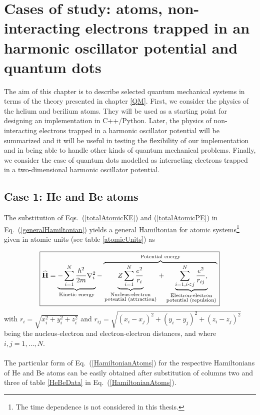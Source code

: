 
\chapter{Cases of study: atoms, non-interacting electrons trapped in an harmonic oscillator potential and quantum dots}\label{cases}

The aim of this chapter is
to describe selected quantum mechanical systems in terms of the theory presented in chapter \ref{QM}. First, we consider the physics of the helium and berilium atoms. They will be used as a starting point for designing an implementation in C++/Python. Later, the physics of non-interacting electrons trapped in a harmonic oscillator potential will be summarized and it will be useful in testing the flexibility of our implementation and in being able to handle other kinds of quantum mechanical problems. Finally, we consider the case of quantum dots modelled as interacting electrons trapped in a two-dimensional  
harmonic oscillator potential. 

\section{Case 1: He and Be atoms}
The substitution of Eqs.~(\ref{totalAtomicKE}) and (\ref{totalAtomicPE}) in Eq.~(\ref{generalHamiltonian}) yields a general  Hamiltonian for atomic systems\footnote{The time dependence is not considered in this thesis.} given in atomic units (see table \ref{atomicUnits}) as 

\begin{equation}\label{HamiltonianAtoms}
\boxed{{\bf\widehat{H}} = \underbrace{-\sum_{i=1}^{N}\frac{\hbar^2}{2m}\nabla^{2}_{i}}_{\text{Kinetic energy}} 
  - \overbrace{\underbrace{Z \sum_{i=1}^{N} \frac{e^2}{r_i}}_{\begin{smallmatrix} \text{Nucleus-electron} \\ \text{potential (attraction)} \end{smallmatrix}}
  + \underbrace{\sum_{i=1,i<j}^{N} \frac{e^2}{r_{ij}},}_{\begin{smallmatrix} \text{Electron-electron} \\ \text{potential (repulsion)} \end{smallmatrix}}}^{\text{Potential energy}}}
\end{equation}
with $r_i = \sqrt{x_{i}^2 + y_{i}^2 + z_{i}^2}$ and $r_{ij} = \sqrt{(x_{i} - x_{j})^2 + (y_{i} - y_{j})^2 + (z_{i} - z_{j})^2}$ being the nucleus-electron and electron-electron distances, and where $i,j = 1, \ldots, N$.\\
\\
\noindent
The particular form of Eq.~(\ref{HamiltonianAtoms}) for the respective Hamiltonians of He and Be atoms can be easily obtained after substitution of columns two and three of table \ref{HeBeData} in Eq.~(\ref{HamiltonianAtoms}). 

